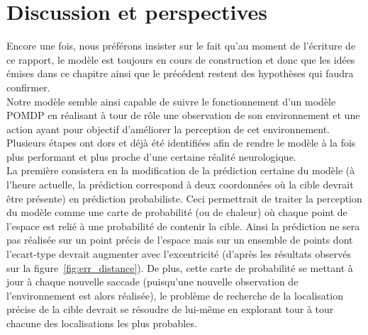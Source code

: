 
\chapter{Discussion et perspectives} %

\label{Discussion} %

Encore une fois, nous préférons insister sur le fait qu'au moment de l'écriture de ce rapport, le modèle est toujours en cours de construction et donc que les idées émises dans ce chapitre ainsi que le précédent restent des hypothèses qui faudra confirmer.\\

Notre modèle semble ainsi capable de suivre le fonctionnement d'un modèle POMDP en réalisant à tour de rôle une observation de son environnement et une action ayant pour objectif d'améliorer la perception de cet environnement. \\

	
Plusieurs étapes ont dors et déjà été identifiées afin de rendre le modèle à la fois plus performant et plus proche d'une certaine réalité neurologique.\\
La première consistera en la modification de la prédiction certaine du modèle (à l'heure actuelle, la prédiction correspond à deux coordonnées où la cible devrait être présente) en prédiction probabiliste. Ceci permettrait de traiter la perception du modèle comme une carte de probabilité (ou de chaleur) où chaque point de l'espace est relié à une probabilité de contenir la cible. Ainsi la prédiction ne sera pas réalisée sur un point précis de l'espace mais sur un ensemble de points dont l'ecart-type devrait augmenter avec l'excentricité (d'après les résultats observés sur la figure~\ref{fig:err_distance}). De plus, cette carte de probabilité se mettant à jour à chaque nouvelle saccade (puisqu'une nouvelle observation de l'environnement est alors réalisée), le problème de recherche de la localisation précise de la cible devrait se résoudre de lui-même en explorant tour à tour chacune des localisations les plus probables.